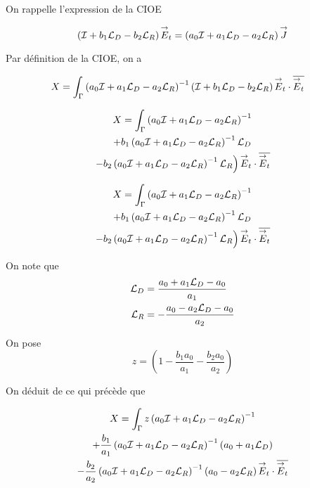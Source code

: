   On rappelle l'expression de la CIOE

  \begin{equation}
    \left(\oI + b_1 \LD - b_2 \LR \right) \vE_t = \left(a_0\oI + a_1 \LD - a_2 \LR \right) \vJ
  \end{equation}

  Par définition de la CIOE, on a

  \begin{align}
    X &= \int_\Gamma \left(a_0\oI + a_1 \LD - a_2 \LR \right)^{-1}\left(\oI + b_1 \LD - b_2 \LR \right) \vE_t\cdot \conj{\vE_t}
  \end{align}

  \begin{multline}
    X = \int_\Gamma \left(a_0\oI + a_1 \LD - a_2 \LR \right)^{-1}
    \\
    + b_1 \left(a_0\oI + a_1 \LD - a_2 \LR \right)^{-1}\LD
    \\
    \left.
    - b_2 \left(a_0\oI + a_1 \LD - a_2 \LR \right)^{-1}\LR \right) \vE_t\cdot \conj{\vE_t}
  \end{multline}

  \begin{multline}
    X = \int_\Gamma \left(a_0\oI + a_1 \LD - a_2 \LR \right)^{-1}
    \\
    + b_1 \left(a_0\oI + a_1 \LD - a_2 \LR \right)^{-1}\LD
    \\
    \left.
    - b_2 \left(a_0\oI + a_1 \LD - a_2 \LR \right)^{-1}\LR \right) \vE_t\cdot \conj{\vE_t}
  \end{multline}

  On note que
  \begin{align}
    \LD & = \frac{a_0 + a_1 \LD - a_0}{a_1}
    \\
    \LR & = -\frac{a_0 - a_2 \LD - a_0}{a_2}
  \end{align}

  On pose
  \begin{equation}
    z = \left(1 - \frac{b_1a_0}{a_1} - \frac{b_2a_0}{a_2}\right)
  \end{equation}

  On déduit de ce qui précède que

  \begin{multline}
    X = \int_\Gamma z\left(a_0\oI + a_1 \LD - a_2 \LR \right)^{-1}
    \\
    + \frac{b_1}{a_1} \left(a_0\oI + a_1 \LD - a_2 \LR \right)^{-1}\left(a_0+a_1\LD\right)
    \\
    - \frac{b_2}{a_2} \left(a_0\oI + a_1 \LD - a_2 \LR \right)^{-1}\left(a_0-a_2\LR\right) \vE_t\cdot \conj{\vE_t}
  \end{multline}

